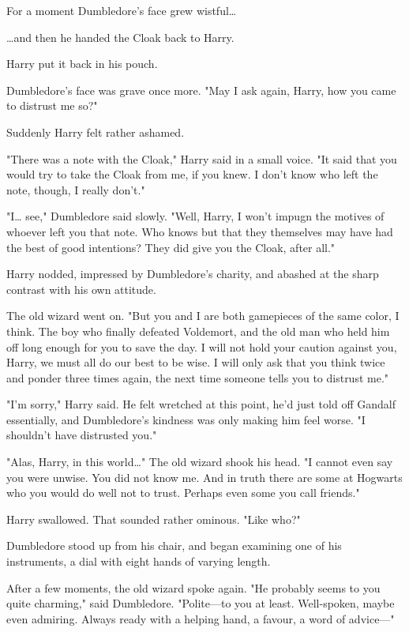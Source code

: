 For a moment Dumbledore's face grew wistful{\ldots}

{\ldots}and then he handed the Cloak back to Harry.

Harry put it back in his pouch.

Dumbledore's face was grave once more. "May I ask again, Harry, how you came to 
distrust me so?"

Suddenly Harry felt rather ashamed.

"There was a note with the Cloak," Harry said in a small voice. "It said that 
you would try to take the Cloak from me, if you knew. I don't know who left the 
note, though, I really don't."

"I{\ldots} see," Dumbledore said slowly. "Well, Harry, I won't impugn the 
motives of whoever left you that note. Who knows but that they themselves may 
have had the best of good intentions? They did give you the Cloak, after all."

Harry nodded, impressed by Dumbledore's charity, and abashed at the sharp 
contrast with his own attitude.

The old wizard went on. "But you and I are both gamepieces of the same color, I 
think. The boy who finally defeated Voldemort, and the old man who held him off 
long enough for you to save the day. I will not hold your caution against you, 
Harry, we must all do our best to be wise. I will only ask that you think twice 
and ponder three times again, the next time someone tells you to distrust me."

"I'm sorry," Harry said. He felt wretched at this point, he'd just told off 
Gandalf essentially, and Dumbledore's kindness was only making him feel worse. 
"I shouldn't have distrusted you."

"Alas, Harry, in this world{\ldots}" The old wizard shook his head. "I cannot 
even say you were unwise. You did not know me. And in truth there are some at 
Hogwarts who you would do well not to trust. Perhaps even some you call 
friends."

Harry swallowed. That sounded rather ominous. "Like who?"

Dumbledore stood up from his chair, and began examining one of his instruments, 
a dial with eight hands of varying length.

After a few moments, the old wizard spoke again. "He probably seems to you 
quite charming," said Dumbledore. "Polite---to you at least. Well-spoken, maybe 
even admiring. Always ready with a helping hand, a favour, a word of advice---"

